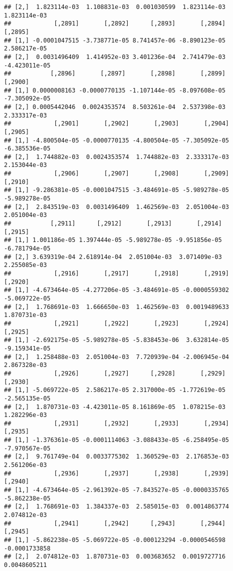 \documentclass[
]{article}
\begin{document}
\begin{verbatim}
## [2,]  1.823114e-03  1.108831e-03  0.001030599  1.823114e-03  1.823114e-03
##            [,2891]       [,2892]      [,2893]       [,2894]       [,2895]
## [1,] -0.0001047515 -3.738771e-05 8.741457e-06 -8.890123e-05  2.586217e-05
## [2,]  0.0031496409  1.414952e-03 3.401236e-04  2.741479e-03 -4.423011e-05
##           [,2896]       [,2897]       [,2898]       [,2899]       [,2900]
## [1,] 0.0000008163 -0.0000770135 -1.107144e-05 -8.097608e-05 -7.305092e-05
## [2,] 0.0005442046  0.0024353574  8.503261e-04  2.537398e-03  2.333317e-03
##            [,2901]       [,2902]       [,2903]       [,2904]       [,2905]
## [1,] -4.800504e-05 -0.0000770135 -4.800504e-05 -7.305092e-05 -6.385536e-05
## [2,]  1.744882e-03  0.0024353574  1.744882e-03  2.333317e-03  2.153044e-03
##            [,2906]       [,2907]       [,2908]       [,2909]       [,2910]
## [1,] -9.286381e-05 -0.0001047515 -3.484691e-05 -5.989278e-05 -5.989278e-05
## [2,]  2.843519e-03  0.0031496409  1.462569e-03  2.051004e-03  2.051004e-03
##           [,2911]      [,2912]       [,2913]       [,2914]       [,2915]
## [1,] 1.001186e-05 1.397444e-05 -5.989278e-05 -9.951856e-05 -6.781794e-05
## [2,] 3.639319e-04 2.618914e-04  2.051004e-03  3.071409e-03  2.255085e-03
##            [,2916]       [,2917]       [,2918]       [,2919]       [,2920]
## [1,] -4.673464e-05 -4.277206e-05 -3.484691e-05 -0.0000559302 -5.069722e-05
## [2,]  1.768691e-03  1.666650e-03  1.462569e-03  0.0019489633  1.870731e-03
##            [,2921]       [,2922]       [,2923]       [,2924]       [,2925]
## [1,] -2.692175e-05 -5.989278e-05 -5.838453e-06  3.632814e-05 -9.159341e-05
## [2,]  1.258488e-03  2.051004e-03  7.720939e-04 -2.006945e-04  2.867328e-03
##            [,2926]       [,2927]      [,2928]       [,2929]       [,2930]
## [1,] -5.069722e-05  2.586217e-05 2.317000e-05 -1.772619e-05 -2.565135e-05
## [2,]  1.870731e-03 -4.423011e-05 8.161869e-05  1.078215e-03  1.282296e-03
##            [,2931]       [,2932]       [,2933]       [,2934]       [,2935]
## [1,] -1.376361e-05 -0.0001114063 -3.088433e-05 -6.258495e-05 -7.970567e-05
## [2,]  9.761749e-04  0.0033775302  1.360529e-03  2.176853e-03  2.561206e-03
##            [,2936]       [,2937]       [,2938]       [,2939]       [,2940]
## [1,] -4.673464e-05 -2.961392e-05 -7.843527e-05 -0.0000335765 -5.862238e-05
## [2,]  1.768691e-03  1.384337e-03  2.585015e-03  0.0014863774  2.074812e-03
##            [,2941]       [,2942]      [,2943]       [,2944]       [,2945]
## [1,] -5.862238e-05 -5.069722e-05 -0.000123294 -0.0000546598 -0.0001733858
## [2,]  2.074812e-03  1.870731e-03  0.003683652  0.0019727716  0.0048605211

\end{verbatim}
\end{document}
